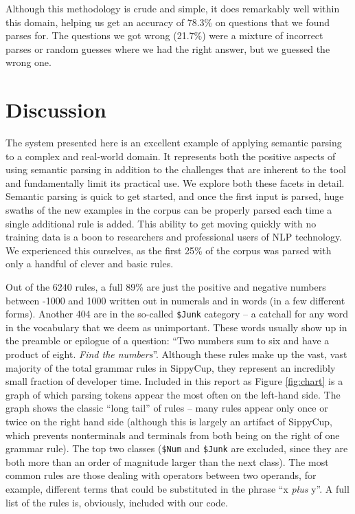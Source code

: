 \documentclass[11pt]{article}
\begin{document}
Although this methodology is crude and simple, it does remarkably well within this domain, helping us get an accuracy of 78.3\% on questions that we found parses for. The questions we got wrong (21.7\%) were a mixture of incorrect parses or random guesses where we had the right answer, but we guessed the wrong one.

\section{Discussion}
The system presented here is an excellent example of applying semantic parsing to a complex and real-world domain. It represents both the positive aspects of using semantic parsing in addition to the challenges that are inherent to the tool and fundamentally limit its practical use. We explore both these facets in detail. Semantic parsing is quick to get started, and once the first input is parsed, huge swaths of the new examples in the corpus can be properly parsed each time a single additional rule is added. This ability to get moving quickly with no training data is a boon to researchers and professional users of NLP technology. We experienced this ourselves, as the first 25\% of the corpus was parsed with only a handful of clever and basic rules.

Out of the 6240 rules, a full 89\% are just the positive and negative numbers between -1000 and 1000 written out in numerals and in words (in a few different forms). Another 404 are in the so-called \texttt{\$Junk} category -- a catchall for any word in the vocabulary that we deem as unimportant. These words usually show up in the preamble or epilogue of a question: ``Two numbers sum to six and have a product of eight. \textit{Find the numbers}''. Although these rules make up the vast, vast majority of the total grammar rules in SippyCup, they represent an incredibly small fraction of developer time. Included in this report as Figure \ref{fig:chart} is a graph of which parsing tokens appear the most often on the left-hand side.  The graph shows the classic ``long tail'' of rules -- many rules appear only once or twice on the right hand side (although this is largely an artifact of SippyCup, which prevents nonterminals and terminals from both being on the right of one grammar rule). The top two classes (\texttt{\$Num} and \texttt{\$Junk} are excluded, since they are both more than an order of magnitude larger than the next class). The most common rules are those dealing with operators between two operands, for example, different terms that could be substituted in the phrase ``x \textit{plus} y''. A full list of the rules is, obviously, included with our code.
\end{document}
